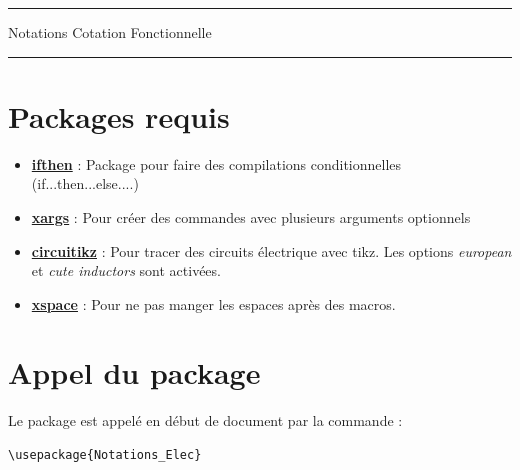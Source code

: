 \documentclass[a4paper,12pt]{article}
\begin{document}
	\begin{center}
		\hrule{\Large Notations Cotation Fonctionnelle}\\\hrule
	\end{center}


	\section{Packages requis}

		\begin{itemize}
			\item \href{http://www.ctan.org/pkg/ifthen}{\textbf{ifthen}} : Package pour faire des compilations conditionnelles (if...then...else....)
			\item \href{http://www.ctan.org/pkg/xargs}{\textbf{xargs}} : Pour créer des commandes avec plusieurs arguments optionnels
			\item \href{https://www.ctan.org/pkg/circuitikz}{\textbf{circuitikz}} : Pour tracer des circuits électrique avec tikz. Les options \emph{european} et \emph{cute inductors} sont activées.
			\item \href{https://www.ctan.org/pkg/xspace}{\textbf{xspace}} : Pour ne pas manger les espaces après des macros.
		\end{itemize}
		
		
	\section{Appel du package}

		Le package est appelé en début de document par la commande :
		\begin{verbatim}
\usepackage{Notations_Elec}
		\end{verbatim}
\end{document}
